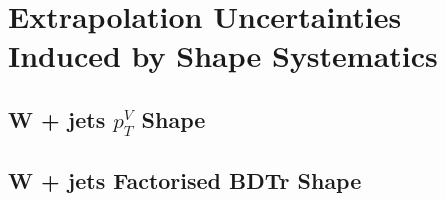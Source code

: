 \chapter{Extrapolation Uncertainties Induced by Shape Systematics}

\section{W + jets $p_T^V$ Shape}



\section{W + jets Factorised BDTr Shape}